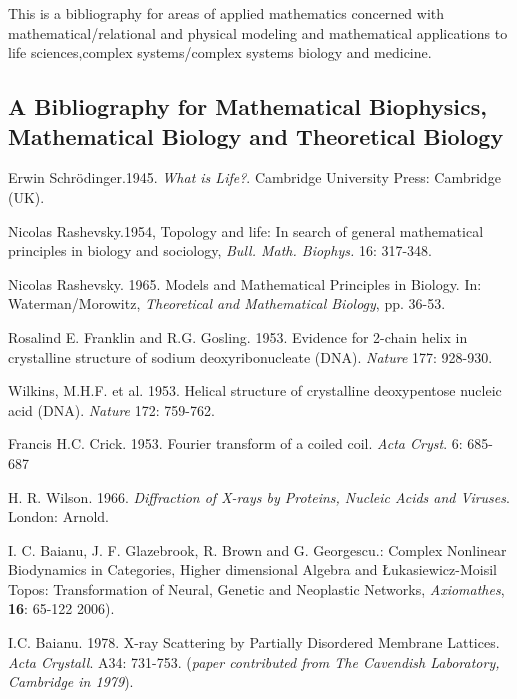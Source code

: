 \documentclass[12pt]{article}
\theoremstyle{plain}
\theoremstyle{definition}
\numberwithin{equation}{section}
\begin{document}
This is a bibliography for areas of applied mathematics concerned with mathematical/relational and physical modeling and mathematical applications to life sciences,complex systems/complex systems biology and medicine.

\subsection{A Bibliography for Mathematical Biophysics, Mathematical Biology and Theoretical Biology}


\begin{thebibliography}{9}

Erwin Schr\"odinger.1945. \emph{What is Life?}. Cambridge University Press: Cambridge (UK).

Nicolas Rashevsky.1954, Topology and life: In search of general mathematical principles in 
biology and sociology, \emph{Bull. Math. Biophys.} 16: 317-348. 

Nicolas Rashevsky. 1965. Models and Mathematical Principles in Biology. In: Waterman/Morowitz, \emph{Theoretical and Mathematical Biology}, pp. 36-53.

Rosalind E. Franklin and R.G. Gosling. 1953. Evidence for 2-chain helix in crystalline structure
of sodium deoxyribonucleate (DNA). \emph{Nature} 177: 928-930. 

Wilkins, M.H.F. et al. 1953. Helical structure of crystalline deoxypentose nucleic acid (DNA).
\emph{Nature} 172: 759-762.

Francis H.C. Crick. 1953. Fourier transform of a coiled coil. \emph{Acta Cryst}. 6: 685-687

H. R. Wilson. 1966. \emph{Diffraction of X-rays by Proteins, Nucleic Acids and Viruses}.
London: Arnold.

I. C. Baianu, J. F. Glazebrook, R. Brown and G. Georgescu.: Complex Nonlinear Biodynamics in Categories, Higher dimensional Algebra and \L{}ukasiewicz-Moisil Topos: Transformation of Neural, Genetic and Neoplastic Networks, \emph{Axiomathes}, \textbf{16}: 65-122 2006).

I.C. Baianu. 1978. X-ray Scattering by Partially Disordered Membrane Lattices. {\em Acta Crystall}. A34: 731-753.   
(\emph{paper contributed from The Cavendish Laboratory, Cambridge in 1979}). 


\end{thebibliography}
\end{document}
